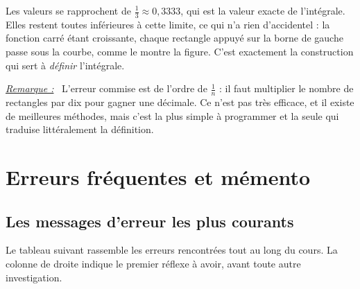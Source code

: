 \documentclass[a4paper,11pt,openany]{book}
\newenvironment{remarque}%
 {\par\vspace{1mm}\begin{list}{}{\leftmargin=1cm \rightmargin=0.5cm}\item[]%
  \textit{\underline{Remarque :}}~}%
 {\end{list}\vspace{1mm}}
\begin{document}
Les valeurs se rapprochent de $\frac{1}{3} \approx 0{,}3333$, qui est la valeur exacte de l'intégrale. Elles restent toutes inférieures à cette limite, ce qui n'a rien d'accidentel : la fonction carré étant croissante, chaque rectangle appuyé sur la borne de gauche passe sous la courbe, comme le montre la figure. C'est exactement la construction qui sert à \emph{définir} l'intégrale.

\begin{remarque}
L'erreur commise est de l'ordre de $\frac{1}{n}$ : il faut multiplier le nombre de rectangles par dix pour gagner une décimale. Ce n'est pas très efficace, et il existe de meilleures méthodes, mais c'est la plus simple à programmer et la seule qui traduise littéralement la définition.
\end{remarque}
\appendix
\chapter{Erreurs fréquentes et mémento}

\section{Les messages d'erreur les plus courants}

Le tableau suivant rassemble les erreurs rencontrées tout au long du cours. La colonne de droite indique le premier réflexe à avoir, avant toute autre investigation.
\end{document}
